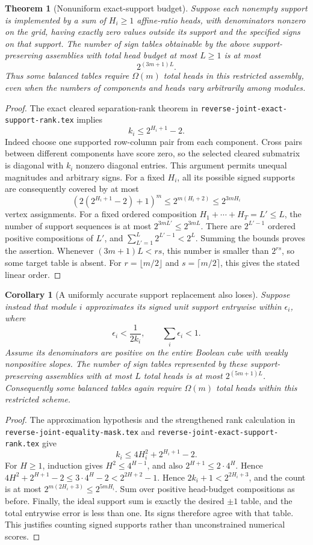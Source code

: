 \documentclass[11pt]{article}
\newtheorem{theorem}{Theorem}
\newtheorem{corollary}{Corollary}
\begin{document}
\begin{theorem}[Nonuniform exact-support budget]
Suppose each nonempty support is implemented by a sum of $H_i\geq1$
affine-ratio heads, with denominators nonzero on the grid, having exactly
zero values outside its support and the specified signs on that support.
The number of sign tables obtainable by the above support-preserving
assemblies with total head budget at most $L\geq1$ is at most
\[
 2^{(3m+1)L}.
\]
Thus some balanced tables require $\Omega(m)$ total heads in this
restricted assembly, even when the numbers of components and heads vary
arbitrarily among modules.
\end{theorem}
\begin{proof}
The exact cleared separation-rank theorem in
\texttt{reverse-joint-exact-support-rank.tex} implies
\[
 k_i\leq 2^{H_i+1}-2.
\]
Indeed choose one supported row-column pair from each component. Cross
pairs between different components have score zero, so the selected
cleared submatrix is diagonal with $k_i$ nonzero diagonal entries.
This argument permits unequal magnitudes and arbitrary signs.
For a fixed $H_i$, all its possible signed supports are consequently
covered by at most
\[
 (2(2^{H_i+1}-2)+1)^m
 \leq 2^{m(H_i+2)}\leq2^{3mH_i}
\]
vertex assignments. For a fixed ordered composition
$H_1+\cdots+H_T=L'\leq L$, the number of support sequences is at most
$2^{3mL'}\leq2^{3mL}$.
There are $2^{L'-1}$ ordered positive compositions of $L'$, and
$\sum_{L'=1}^L2^{L'-1}<2^L$. Summing the bounds proves the assertion.
Whenever $(3m+1)L<rs$, this number is smaller than $2^{rs}$, so some
target table is absent. For $r=\lfloor m/2\rfloor$ and
$s=\lceil m/2\rceil$, this gives the stated linear order.
\end{proof}

\begin{corollary}[A uniformly accurate support replacement also loses]
Suppose instead that module $i$ approximates its signed unit support
entrywise within $\epsilon_i$, where
\[
 \epsilon_i<\frac1{2k_i},\qquad
 \sum_i\epsilon_i<1.
\]
Assume its denominators are positive on the entire Boolean cube with
weakly nonpositive slopes. The number of sign tables represented by these
support-preserving assemblies with at most $L$ total heads is at most
$2^{(5m+1)L}$. Consequently some balanced tables again require
$\Omega(m)$ total heads within this restricted scheme.
\end{corollary}
\begin{proof}
The approximation hypothesis and the strengthened rank calculation in
\texttt{reverse-joint-equality-mask.tex} and
\texttt{reverse-joint-exact-support-rank.tex} give
\[
 k_i\leq4H_i^2+2^{H_i+1}-2.
\]
For $H\geq1$, induction gives $H^2\leq4^{H-1}$, and also
$2^{H+1}\leq2\cdot4^H$. Hence
$4H^2+2^{H+1}-2\leq3\cdot4^H-2<2^{2H+2}-1$.
Hence $2k_i+1<2^{2H_i+3}$, and the count is at most
$2^{m(2H_i+3)}\leq2^{5mH_i}$. Sum over positive head-budget
compositions as before.
Finally, the ideal support sum is exactly the desired $\pm1$ table,
and the total entrywise error is less than one. Its signs therefore
agree with that table. This justifies counting signed supports rather
than unconstrained numerical scores.
\end{proof}
\end{document}
